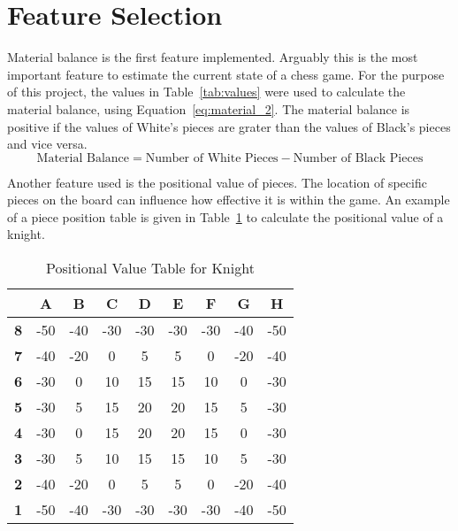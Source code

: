 \section{Feature Selection}

Material balance is the first feature implemented. Arguably this is the most important feature to estimate the current state of a chess game. For the purpose of this project, the values in Table~\ref{tab:values} were used to calculate the material balance, using Equation~\ref{eq:material_2}. The material balance is positive if the values of White's pieces are grater than the values of Black's pieces and vice versa.
\begin{equation}
    \label{eq:material_2}
    \text{Material Balance} = \text{Number of White Pieces} - \text{Number of Black Pieces} 
\end{equation}

Another feature used is the positional value of pieces. The location of specific pieces on the board can influence how effective it is within the game. An example of a piece position table is given in Table~\ref{tab:knight_positional_values} to calculate the positional value of a knight.

\begin{table}[h]
    \centering
    \begin{tabular}{|c|c|c|c|c|c|c|c|c|}
        \hline
        \textbf{} & \textbf{A} & \textbf{B} & \textbf{C} & \textbf{D} & \textbf{E} & \textbf{F} & \textbf{G} & \textbf{H} \\
        \hline
        \textbf{8} & -50 & -40 & -30 & -30 & -30 & -30 & -40 & -50 \\
        \textbf{7} & -40 & -20 & 0 & 5 & 5 & 0 & -20 & -40 \\
        \textbf{6} & -30 & 0 & 10 & 15 & 15 & 10 & 0 & -30 \\
        \textbf{5} & -30 & 5 & 15 & 20 & 20 & 15 & 5 & -30 \\
        \textbf{4} & -30 & 0 & 15 & 20 & 20 & 15 & 0 & -30 \\
        \textbf{3} & -30 & 5 & 10 & 15 & 15 & 10 & 5 & -30 \\
        \textbf{2} & -40 & -20 & 0 & 5 & 5 & 0 & -20 & -40 \\
        \textbf{1} & -50 & -40 & -30 & -30 & -30 & -30 & -40 & -50 \\
        \hline
    \end{tabular}
    \caption{Positional Value Table for Knight}
    \label{tab:knight_positional_values}
\end{table}

